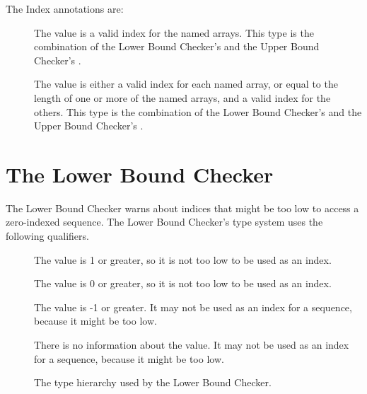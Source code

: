 The Index annotations are:
\begin{description}
\item[]
  The value is a valid index for the named arrays. This type is the combination
  of the Lower Bound Checker's
   and the Upper Bound
  Checker's .
 \item[]
   The value is either a valid index for each named array, or equal to the
   length of one or more of the named arrays, and a valid index for the
   others. This type is the combination of the Lower Bound Checker's
   and the Upper Bound
  Checker's
  .
\end{description}

\section{The Lower Bound Checker\label{index-lowerbound}}

The Lower Bound Checker warns about indices that might be
too low to access a zero-indexed sequence. The
Lower Bound Checker's type system uses the following qualifiers.

\begin{description}
\item[]
  The value is 1 or greater, so it is not too low to be used as an index.
\item[]
  The value is 0 or greater, so it is not too low to be used as an index.
\item[]
  The value is -1 or greater.
  It may not be used as an index for a sequence, because it might be too low.
\item[]
  There is no information about the value.
  It may not be used as an index for a sequence, because it might be too low.
\end{description}

\begin{figure}
  \caption{The type hierarchy used by the Lower Bound Checker.}
  \label{fig-lowerbound-types}
\end{figure}

